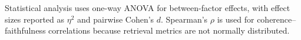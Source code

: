 Statistical analysis uses one-way ANOVA for between-factor effects, with
effect sizes reported as $\eta^2$ and pairwise Cohen's $d$. Spearman's
$\rho$ is used for coherence--faithfulness correlations because retrieval
metrics are not normally distributed.

\FloatBarrier
